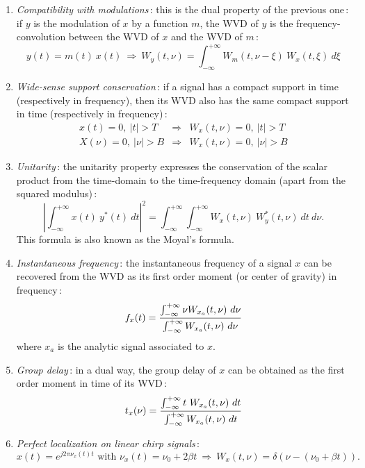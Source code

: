 \begin{enumerate}
\item {\it Compatibility with modulations}\,: this is the dual property of the previous one\,: if $y$ is
the modulation of $x$ by a function $m$, the WVD of $y$ is the
frequency-convolution between the WVD of $x$ and the WVD of $m$\,:
\[y(t)=m(t)\ x(t)\ \Rightarrow\ W_y(t,\nu)=\int_{-\infty}^{+\infty}
W_m(t,\nu-\xi)\ W_x(t,\xi)\ d\xi\] 

\item {\it Wide-sense support conservation}\,:
if a signal has a compact support in time (respectively in frequency), then
its WVD also has the same compact support in time (respectively in
frequency)\,:
\begin{eqnarray*}
	x(t)=0,\ |t|>T  &\Rightarrow &  W_x(t,\nu)=0,\ |t|>T\\
	X(\nu)=0,\ |\nu|>B  &\Rightarrow &  W_x(t,\nu)=0,\ |\nu|>B
\end{eqnarray*}

\item {\it Unitarity}\label{unitarity}\,: the unitarity property
expresses the conservation of the scalar product from the time-domain to
the time-frequency domain (apart from the squared modulus)\,:
\[\left|\int_{-\infty}^{+\infty} x(t)\ y^*(t)\ dt\right|^2 = \int_{-\infty}^{+\infty}
\int_{-\infty}^{+\infty} W_x(t,\nu)\ W_y^*(t,\nu)\ dt\ d\nu.\] 
This formula is also known as the Moyal's formula.

\item {\it Instantaneous frequency}\,: the
instantaneous frequency of a signal $x$ can be recovered from the WVD as
its first order moment (or center of gravity) in frequency\,:
\[f_x(t)=
{\int_{-\infty}^{+\infty} \nu W_{x_a}(t,\nu)\ d\nu
\over 
\int_{-\infty}^{+\infty} W_{x_a}(t,\nu)\ d\nu}\] 
where $x_a$ is the analytic signal associated to $x$.

\item {\it Group delay}\,: in a dual way, the group
delay of $x$ can be obtained as the first order moment in time of its WVD\,:
\[t_x(\nu)={\int_{-\infty}^{+\infty} t\ W_{x_a}(t,\nu)\
dt\over \int_{-\infty}^{+\infty} W_{x_a}(t,\nu)\ dt}\] 

\item {\it Perfect localization on linear chirp signals}\index{perfect
localization}\,:
\[x(t)=e^{j2\pi \nu_x(t) t}  \mbox{ with }  \nu_x(t)=\nu_0+2\beta t\
		  \Rightarrow\ W_x(t,\nu)=\delta(\nu-(\nu_0+\beta t)).\]
\end{enumerate}

